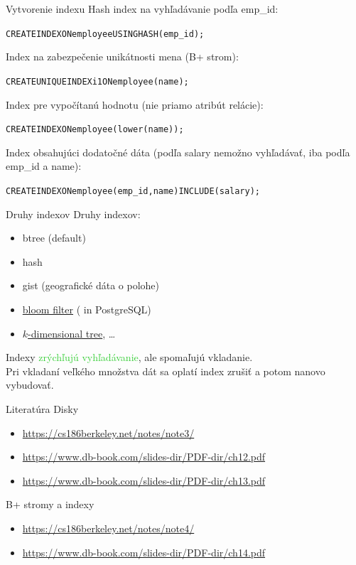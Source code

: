 \documentclass[12pt]{beamer}
\def\blue#1{\textcolor{Cerulean}{#1}}
\def\green#1{\textcolor{LimeGreen}{#1}}
\begin{document}
\begin{frame}[fragile]{Vytvorenie indexu}
Hash index na vyhľadávanie podľa emp\_id:
\begin{alltt}
  \blue{CREATE INDEX ON employee USING HASH (emp_id);}
\end{alltt}
Index na zabezpečenie unikátnosti mena (B+ strom):
\begin{alltt}
  \blue{CREATE UNIQUE INDEX i1 ON employee (name);}
\end{alltt}
Index pre vypočítanú hodnotu (nie priamo atribút relácie):
\begin{alltt}
  \blue{CREATE INDEX ON employee (lower(name));}
\end{alltt}
Index obsahujúci dodatočné dáta (podľa salary nemožno vyhľadávať, iba podľa emp\_id a name):
{\small
\begin{alltt}
  \blue{CREATE INDEX ON employee (emp_id, name) INCLUDE (salary);}
\end{alltt}
}
\end{frame}

\begin{frame}[fragile]{Druhy indexov}
Druhy indexov:
\begin{itemize}
  \item btree (default)
  \item hash
  \item gist (geografické dáta o polohe)
  \item \href{https://brilliant.org/wiki/bloom-filter/#:~:text=A%20bloom%20filter%20is%20a,is%20added%20to%20the%20set.}{bloom filter} (\uv{user-installed} in PostgreSQL)
  \item \href{https://en.wikipedia.org/wiki/K-d_tree}{$k$-dimensional tree}, \dots
\end{itemize}
\bigskip

Indexy \green{zrýchľujú vyhľadávanie}, ale \alert{spomaľujú vkladanie}.\\
Pri vkladaní veľkého množstva dát sa oplatí index zrušiť a potom nanovo vybudovať.
\end{frame}


\begin{frame}{Literatúra}
Disky
\begin{itemize}
\item {\scriptsize\url{https://cs186berkeley.net/notes/note3/}}
\item {\scriptsize\url{https://www.db-book.com/slides-dir/PDF-dir/ch12.pdf}}
\item {\scriptsize\url{https://www.db-book.com/slides-dir/PDF-dir/ch13.pdf}}
\end{itemize}
\bigskip

B+ stromy a indexy
\begin{itemize}
\item {\scriptsize\url{https://cs186berkeley.net/notes/note4/}}
\item {\scriptsize\url{https://www.db-book.com/slides-dir/PDF-dir/ch14.pdf}}
\end{itemize}
\end{frame}
\end{document}
